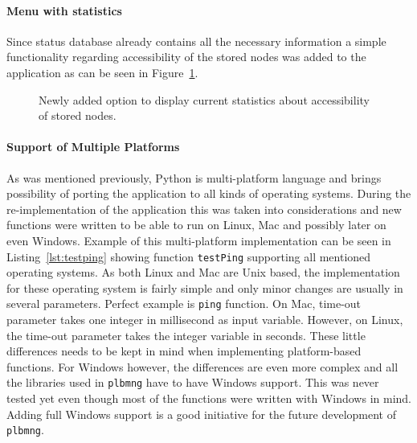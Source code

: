 {{{{{{\paragraph{Menu with statistics}
Since status database already contains all the necessary information a simple functionality regarding accessibility of the stored nodes was added to the application as can be seen in Figure~\ref{fig:statmenu}. 

\begin{figure}[H]
	\centering
	\caption{Newly added option to display current statistics about accessibility of stored nodes.}
	\label{fig:statmenu}
\end{figure}

\paragraph{Support of Multiple Platforms}
As was mentioned previously, Python is multi-platform language and brings possibility of porting the application to all kinds of operating systems. During the re-implementation of the application this was taken into considerations and new functions were written to be able to run on Linux, Mac and possibly later on even Windows. Example of this multi-platform implementation can be seen in Listing~\ref{lst:testping} showing function \texttt{testPing} supporting all mentioned operating systems. As both Linux and Mac are Unix based, the implementation for these operating system is fairly simple and only minor changes are usually in several parameters. Perfect example is \texttt{ping} function. On Mac, time-out parameter takes one integer in millisecond as input variable. However, on Linux, the time-out parameter takes the integer variable in seconds. These little differences needs to be kept in mind when implementing platform-based functions. For Windows however, the differences are even more complex and all the libraries used in \texttt{plbmng} have to have Windows support. This was never tested yet even though most of the functions were written with Windows in mind. Adding full Windows support is a good initiative for the future development of \texttt{plbmng}.

}}}}}}
